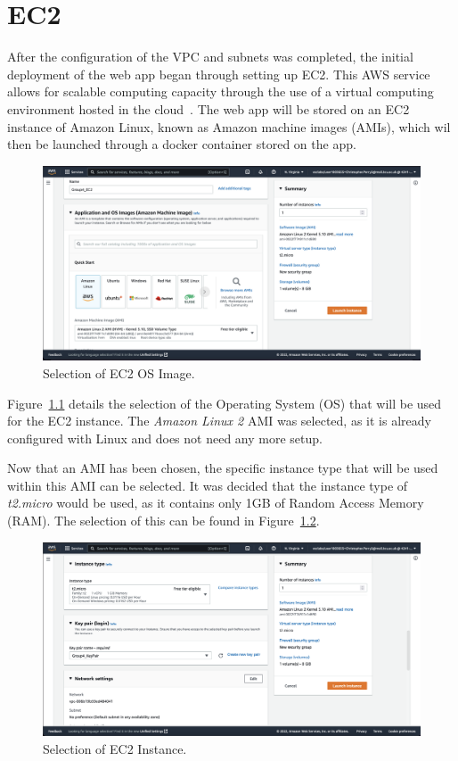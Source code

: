 \chapter{EC2}\label{ch:ec2}

After the configuration of the VPC and subnets was completed, the initial deployment of the web app began through
setting up EC2.
This AWS service allows for scalable computing capacity through the use of a virtual computing environment hosted in the
cloud~\parencite{aws2022ec2}.
The web app will be stored on an EC2 instance of Amazon Linux, known as Amazon machine images (AMIs), which wil then be
launched through a docker container stored on the app.

\begin{figure}[!htbp]
    \centering
    \includegraphics[scale=0.3]{resources/ec2/create-instance-application-and-os-images}
    \caption{Selection of EC2 OS Image.}
    \label{fig:ec2-os}
\end{figure}

Figure~\ref{fig:ec2-os} details the selection of the Operating System (OS) that will be used for the EC2 instance.
The \textit{Amazon Linux 2} AMI was selected, as it is already configured with Linux and does not need any more setup.

\clearpage

Now that an AMI has been chosen, the specific instance type that will be used within this AMI can be selected.
It was decided that the instance type of \textit{t2.micro} would be used, as it contains only 1GB of Random Access
Memory (RAM).
The selection of this can be found in Figure~\ref{fig:ec2-instance}.

\begin{figure}[!htbp]
    \centering
    \includegraphics[scale=0.3]{resources/ec2/create-instance-instance-type}
    \caption{Selection of EC2 Instance.}
    \label{fig:ec2-instance}
\end{figure}

